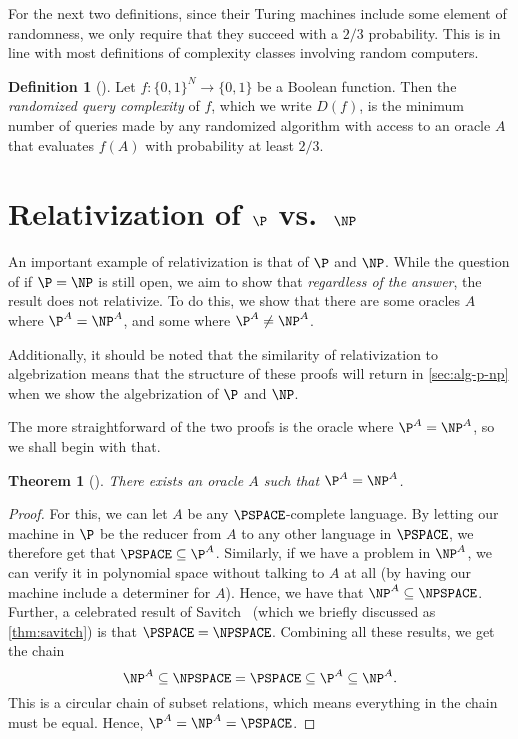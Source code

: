 \documentclass[english,12pt]{reedthesis}
\theoremstyle{plain}
\newtheorem{thm}{Theorem}[section]
\theoremstyle{definition}
\newtheorem{defn}[defn]{Definition}
\theoremstyle{remark}
\begin{document}
For the next two definitions, since their Turing machines include some element
of randomness, we only require that they succeed with a $2/3$ probability. This
is in line with most definitions of complexity classes involving random
computers.

\begin{defn}[{\cite[17]{AW09}}]\label{def:rand-qc}
  Let $f\colon \{0, 1\}^{N} \rightarrow \{0, 1\}$ be a Boolean function. Then the
  \emph{randomized query complexity} of $f$, which we write $D(f)$, is the
  minimum number of queries made by any randomized algorithm with access to an
  oracle $A$ that evaluates $f(A)$ with probability at least $2/3$.
\end{defn}

\section{Relativization of $\P$ vs.\ $\NP$}\label{sec:rel-p-np}

An important example of relativization is that of $\P$ and $\NP$. While the
question of if $\P = \NP$ is still open, we aim to show that \emph{regardless of
  the answer}, the result does not relativize. To do this, we show that there
are some oracles $A$ where $\P^{A} = \NP^{A}$, and some where
$\P^{A} \ne \NP^{A}$.

Additionally, it should be noted that the similarity of relativization to
algebrization means that the structure of these proofs will return in
\cref{sec:alg-p-np} when we show the algebrization of $\P$ and $\NP$.

The more straightforward of the two proofs is the oracle where
$\P^{A} = \NP^{A}$, so we shall begin with that.

\begin{thm}[{\cite[Theorem 2]{BGS75}}]\label{thm:p-np-rel}
  There exists an oracle $A$ such that $\P^{A} = \NP^{A}$.
\end{thm}

\begin{proof}
  For this, we can let $A$ be any $\PSPACE$-complete language. By letting our
  machine in $\P$ be the reducer from $A$ to any other language in $\PSPACE$, we
  therefore get that $\PSPACE \subseteq \P^{A}$. Similarly, if we have a problem in
  $\NP^{A}$, we can verify it in polynomial space without talking to $A$ at all
  (by having our machine include a determiner for $A$). Hence, we have that
  $\NP^{A} \subseteq \NPSPACE$. Further, a celebrated result of Savitch~\cite{Sav70}
  (which we briefly discussed as \cref{thm:savitch}) is that
  $\PSPACE = \NPSPACE$. Combining all these results, we get the chain
  \begin{equation}
    \NP^{A} \subseteq \NPSPACE = \PSPACE \subseteq \P^{A} \subseteq \NP^{A}.
  \end{equation}
  This is a circular chain of subset relations, which means everything in the
  chain must be equal. Hence, $\P^{A} = \NP^{A} = \PSPACE$.
\end{proof}
\end{document}
